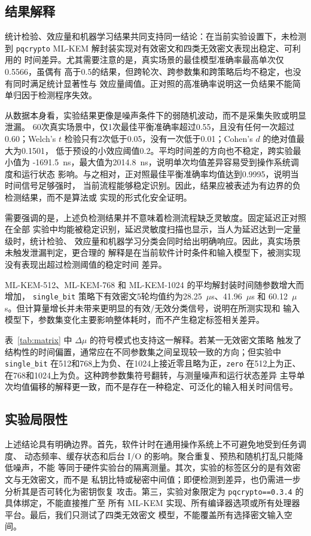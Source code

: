 \documentclass[a4paper,fontset=none]{ctexart}
\begin{document}
\subsection{结果解释}

统计检验、效应量和机器学习结果共同支持同一结论：在当前实验设置下，未检测到
\texttt{pqcrypto} ML-KEM 解封装实现对有效密文和四类无效密文表现出稳定、可利用的
时间差异。尤其需要注意的是，真实场景的最佳模型准确率最高单次仅0.5566，虽偶有
高于0.5的结果，但跨轮次、跨参数集和跨策略后均不稳定，也没有同时满足统计显著性与
效应量阈值。正对照的高准确率说明这一负结果不能简单归因于检测程序失效。

从数据本身看，实验结果更像是噪声条件下的弱随机波动，而不是采集失败或明显泄漏。
60次真实场景中，仅1次最佳平衡准确率超过0.55，且没有任何一次超过0.60；Welch's
$t$ 检验只有2次低于0.05，没有一次低于0.01；Cohen's $d$ 的绝对值最大为0.1501，
低于预设的小效应阈值0.2。平均时间差的方向也不稳定，跨实验最小值为
-1691.5~ns，最大值为2014.8~ns，说明单次均值差异容易受到操作系统调度和运行状态
影响。与之相对，正对照最佳平衡准确率均值达到0.9995，说明当时间信号足够强时，
当前流程能够稳定识别。因此，结果应被表述为有边界的负检测结果，而不是算法或
实现的形式化安全证明。

需要强调的是，上述负检测结果并不意味着检测流程缺乏灵敏度。固定延迟正对照在全部
实验中均能被稳定识别，延迟灵敏度扫描也显示，当人为延迟达到一定量级时，统计检验、
效应量和机器学习分类会同时给出明确响应。因此，真实场景未触发泄漏判定，更合理的
解释是在当前软件计时条件和输入模型下，被测实现没有表现出超过检测阈值的稳定时间
差异。

ML-KEM-512、ML-KEM-768 和 ML-KEM-1024 的平均解封装时间随参数增大而增加，
\texttt{single\_bit} 策略下有效密文5轮均值约为28.25~$\mu$s、41.96~$\mu$s 和
60.12~$\mu$s。但计算量增长并未带来更明显的有效/无效分类信号，说明在所测实现和
输入模型下，参数集变化主要影响整体耗时，而不产生稳定标签相关差异。

表~\ref{tab:matrix} 中 $\Delta\mu$ 的符号模式也支持这一解释。若某一无效密文策略
触发了结构性的时间偏置，通常应在不同参数集之间呈现较一致的方向；但实验中
\texttt{single\_bit} 在512和768上为负、在1024上接近零且略为正，\texttt{zero}
在512上为正、在768和1024上为负。这种跨参数集符号翻转，与测量噪声和运行状态差异
主导单次均值偏移的解释更一致，而不是存在一种稳定、可泛化的输入相关时间信号。

\subsection{实验局限性}

上述结论具有明确边界。首先，软件计时在通用操作系统上不可避免地受到任务调度、
动态频率、缓存状态和后台 I/O 的影响。聚合重复、预热和随机打乱只能降低噪声，不能
等同于硬件实验台的隔离测量。其次，实验的标签区分的是有效密文与无效密文，而不是
私钥比特或秘密中间值；即便检测到差异，也仍需进一步分析其是否可转化为密钥恢复
攻击。第三，实验对象限定为 \texttt{pqcrypto==0.3.4} 的具体绑定，不能直接推广至
所有 ML-KEM 实现、所有编译器选项或所有处理器平台。最后，我们只测试了四类无效密文
模型，不能覆盖所有选择密文输入空间。
\end{document}
